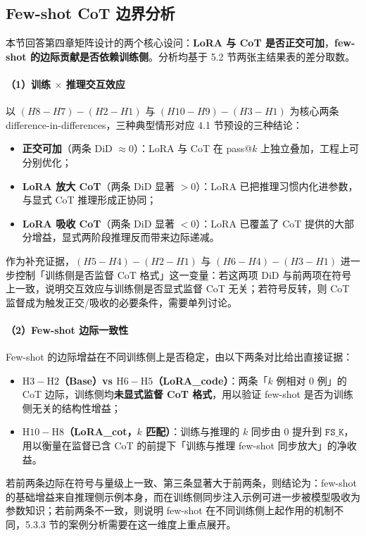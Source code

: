 \subsection{Few-shot CoT 边界分析}

本节回答第四章矩阵设计的两个核心设问：\textbf{LoRA 与 CoT 是否正交可加}，\textbf{few-shot 的边际贡献是否依赖训练侧}。分析均基于 5.2 节两张主结果表的差分取数。

\paragraph{（1）训练 $\times$ 推理交互效应}
以 $(H8 - H7) - (H2 - H1)$ 与 $(H10 - H9) - (H3 - H1)$ 为核心两条 difference-in-differences，三种典型情形对应 4.1 节预设的三种结论：
\begin{itemize}
    \item \textbf{正交可加}（两条 DiD $\approx 0$）：LoRA 与 CoT 在 pass@$k$ 上独立叠加，工程上可分别优化；
    \item \textbf{LoRA 放大 CoT}（两条 DiD 显著 $> 0$）：LoRA 已把推理习惯内化进参数，与显式 CoT 推理形成正协同；
    \item \textbf{LoRA 吸收 CoT}（两条 DiD 显著 $< 0$）：LoRA 已覆盖了 CoT 提供的大部分增益，显式两阶段推理反而带来边际递减。
\end{itemize}
作为补充证据，$(H5 - H4) - (H2 - H1)$ 与 $(H6 - H4) - (H3 - H1)$ 进一步控制「训练侧是否监督 CoT 格式」这一变量：若这两项 DiD 与前两项在符号上一致，说明交互效应与训练侧是否显式监督 CoT 无关；若符号反转，则 CoT 监督成为触发正交/吸收的必要条件，需要单列讨论。


\paragraph{（2）Few-shot 边际一致性}
Few-shot 的边际增益在不同训练侧上是否稳定，由以下两条对比给出直接证据：
\begin{itemize}
    \item \textbf{$\mathrm{H3} - \mathrm{H2}$（Base）vs $\mathrm{H6} - \mathrm{H5}$（LoRA\_code）}：两条「$k$ 例相对 $0$ 例」的 CoT 边际，训练侧均\textbf{未显式监督 CoT 格式}，用以验证 few-shot 是否为训练侧无关的结构性增益；
    \item \textbf{$\mathrm{H10} - \mathrm{H8}$（LoRA\_cot，$k$ 匹配）}：训练与推理的 $k$ 同步由 $0$ 提升到 $\texttt{FS\_K}$，用以衡量在监督已含 CoT 的前提下「训练与推理 few-shot 同步放大」的净收益。
\end{itemize}
若前两条边际在符号与量级上一致、第三条显著大于前两条，则结论为：few-shot 的基础增益来自推理侧示例本身，而在训练侧同步注入示例可进一步被模型吸收为参数知识；若前两条不一致，则说明 few-shot 在不同训练侧上起作用的机制不同，5.3.3 节的案例分析需要在这一维度上重点展开。

